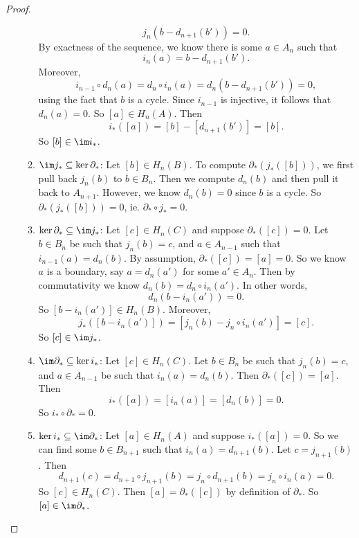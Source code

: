 \documentclass[a4paper]{article}
\begin{document}
\begin{proof}
\begin{enumerate}
\begin{enumerate}
          \[
            j_n (b - d_{n + 1}(b')) = 0.
          \]
          By exactness of the sequence, we know there is some $a \in A_n$ such that
          \[
            i_n(a) = b - d_{n + 1}(b').
          \]
          Moreover,
          \[
            i_{n - 1} \circ d_n(a) = d_n \circ i_n (a) = d_n(b - d_{n + 1}(b')) = 0,
          \]
          using the fact that $b$ is a cycle. Since $i_{n - 1}$ is injective, it follows that $d_n(a) = 0$. So $[a] \in H_n(A)$. Then
          \[
            i_*([a]) = [b] - [d_{n + 1}(b')] = [b].
          \]
          So $[b] \in \im i_*$.
        \item $\im j_* \subseteq \ker \partial_*$: Let $[b] \in H_n(B)$. To compute $\partial_*(j_*([b]))$, we first pull back $j_n(b)$ to $b \in B_n$. Then we compute $d_n(b)$ and then pull it back to $A_{n + 1}$. However, we know $d_n(b) = 0$ since $b$ is a cycle. So $\partial_*(j_*([b])) = 0$, ie. $\partial_* \circ j_* = 0$.
        \item $\ker \partial_* \subseteq \im j_*$: Let $[c] \in H_n(C)$ and suppose $\partial_*([c]) = 0$. Let $b \in B_n$ be such that $j_n(b) = c$, and $a \in A_{n - 1}$ such that $i_{n - 1}(a) = d_n(b)$. By assumption, $\partial_*([c]) = [a] = 0$. So we know $a$ is a boundary, say $a = d_n (a')$ for some $a' \in A_n$. Then by commutativity we know $d_n(b) = d_n \circ i_n (a')$. In other words,
          \[
            d_n(b - i_n(a')) = 0.
          \]
          So $[b - i_n(a')] \in H_n(B)$. Moreover,
          \[
            j_*([b - i_n(a')]) = [j_n(b) - j_n \circ i_n(a')] = [c].
          \]
          So $[c] \in \im j_*$.
        \item $\im \partial_* \subseteq \ker i_*$: Let $[c] \in H_n(C)$. Let $b \in B_n$ be such that $j_n(b) = c$, and $a \in A_{n - 1}$ be such that $i_n(a) = d_n(b)$. Then $\partial_*([c]) = [a]$. Then
          \[
            i_*([a]) = [i_n(a)] = [d_n(b)] = 0.
          \]
          So $i_* \circ \partial_* = 0$.
        \item $\ker i_* \subseteq \im \partial_*$: Let $[a] \in H_n(A)$ and suppose $i_*([a]) = 0$. So we can find some $b \in B_{n + 1}$ such that $i_n(a) = d_{n + 1}(b)$. Let $c = j_{n + 1}(b)$. Then
          \[
            d_{n + 1}(c) = d_{n + 1}\circ j_{n + 1} (b) = j_n \circ d_{n + 1}(b) = j_n \circ i_n (a) = 0.
          \]
          So $[c] \in H_n(C)$. Then $[a] = \partial_*([c])$ by definition of $\partial_*$. So $[a] \in \im \partial_*$.
      \end{enumerate}
  \end{enumerate}
\end{proof}
\end{document}
